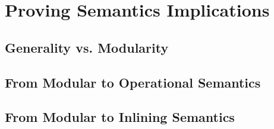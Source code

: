\chapter{Proving Semantics Implications}

\section{Generality vs. Modularity} %
\section{From Modular to Operational Semantics}
\section{From Modular to Inlining Semantics}

